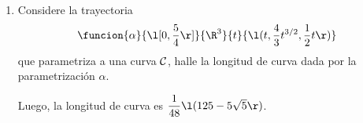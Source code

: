 \documentclass[a4,11pt]{aleph-examen}
\begin{document}
\begin{preguntas}
\begin{respuesta}
\begin{respuesta}
\begin{respuesta}
\begin{enumerate}
\begin{respuesta}
\begin{enumerate}
    \item De reemplazar $x = 1 - y$ en $x^2 + z^2 = 1$ se obtiene 
    \[
        (y - 1)^2 + z^2 = 1.
    \]
    Sean $y = \cos(t) + 1$ y $z = \sen(t)$, entonces $x = -\cos(t)$. Se define la trayectoria
    \[
        \funcion{\alpha}{[0, 2\pi]}{\R}{t}{(-\cos(t), \cos(t) + 1, \sen(t)).}
    \]
    \item Sean $x = 3\cos(t)$ y $y = 3\sen(t)$, entonces se define
    \[
        \funcion{\alpha}{[0, 2\pi]}{\R}{t}{(3\cos(t), 3\sen(t), 0).}
    \]
    \item Sea $x = t$, se tiene entonces que $y = 3t^2$ y se define
    \[
        \funcion{\alpha}{\R}{\R}{t}{(t, 3t^2, 1).}
    \]
    \item Sean $x = 2\cos(t) + 1$ y $y = \sen(t) + 2$, entonces se define
    \[
        \funcion{\alpha}{[0, 2\pi]}{\R}{t}{(2\cos(t) + 1, \sen(t) + 2, -1).}
    \]
    \item De reemplazar $x + y = a$ en $x^2 + y^2 + z^2 = a(x + y)$ se obtiene
    \[
        2\l(y - \dfrac{a}{2}\r)^2 + z^2 = \dfrac{a^2}{2}.
    \]
    Sean $y = \dfrac{a}{2}(1 - \cos(t))$ y $z = \dfrac{a}{\sqrt{2}}\sen(t)$, junto con $x + y = a$ se obtiene que $x = \dfrac{a}{2}(1 + \cos(t))$, se define entonces
    \[
        \funcion{\alpha}{[0, 2\pi]}{\R}{t}{\l(\dfrac{a}{2}(1 + \cos(t)), \dfrac{a}{2}(1 - \cos(t)), \dfrac{a}{\sqrt{2}}\sen(t) \r).}\qedhere
    \]
\end{enumerate}
\end{respuesta}
\item
Considere la trayectoria
\[
    \funcion{\alpha}{\l[0, \dfrac{5}{4}\r]}{\R^3}{t}{\l(t, \dfrac{4}{3}t^{3/2}, \dfrac{1}{2}t\r)}
\]
que parametriza a una curva $\cal{C}$, halle la longitud de curva dada por la parametrización $\alpha$.

\begin{respuesta}\hspace{0pt}

Luego, la longitud de curva es $\dfrac{1}{48}\l(125 - 5\sqrt{5}\r)$.\qedhere
\end{respuesta}


\end{enumerate}
\end{respuesta}
\end{respuesta}
\end{respuesta}
\end{preguntas}
\end{document}
